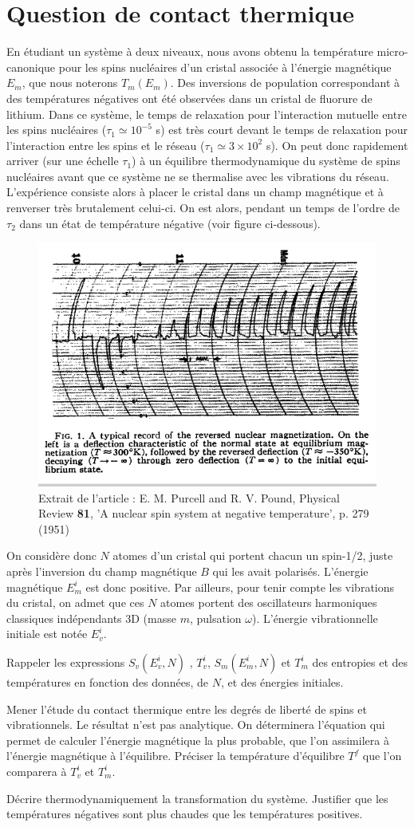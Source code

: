 \documentclass[utf8, 11pt]{feuille}
\begin{document}
\section{Question de contact thermique}
En étudiant un système à deux niveaux, nous avons obtenu la température micro-canonique pour les spins nucléaires d'un cristal associée à l'énergie magnétique $E_m$, que nous noterons $T_m(E_m)$. Des inversions de population correspondant à des températures négatives ont été observées dans un cristal de fluorure de lithium. Dans ce système, le temps de relaxation pour l'interaction mutuelle entre les spins nucléaires ($\tau_1 \simeq 10^{-5}$ s) est très court devant le temps de relaxation pour l'interaction entre les spins et le réseau ($\tau_1 \simeq 3 \times 10^{2}$ s). On peut donc rapidement arriver (sur une échelle $\tau_1$) \`a un équilibre thermodynamique du système de spins nucléaires avant que ce système ne se thermalise avec les vibrations du réseau. L'expérience consiste alors à placer le cristal dans un champ magnétique et à renverser très brutalement celui-ci. On est alors, pendant un temps de l'ordre de $\tau_2$ dans un état de température négative (voir figure ci-dessous).

\begin{figure}[!t]
\centering
\includegraphics[height=.38 \textwidth]{negative}
\caption{Extrait de l'article : E. M. Purcell and R. V. Pound, Physical Review \textbf{81}, 'A nuclear spin system at negative temperature', p. 279 (1951)}
\label{FTN}
\end{figure}

On considère donc $N$ atomes d'un cristal qui portent chacun un spin-1/2, juste après l'inversion du champ magnétique $B$ qui les avait polarisés. L'énergie magnétique $E_m^i$ est donc positive. Par ailleurs, pour tenir compte les vibrations du cristal, on admet que ces $N$ atomes  portent des oscillateurs harmoniques classiques indépendants 3D (masse $m$, pulsation $\omega$). L'énergie vibrationnelle initiale est notée $E_v^i$.


\question
Rappeler les expressions $S_v(E_v^i,N)$ , $T_v^i$, $S_m(E_m^i,N)$ et $T_m^i$ des entropies et des températures en fonction des données, de $N$, et des énergies initiales.


\question
Mener l'étude du contact thermique entre les degrés de liberté de spins et vibrationnels. Le résultat n'est pas analytique. On déterminera l'équation qui permet de calculer l'énergie magnétique la plus probable, que l'on assimilera à l'énergie magnétique à l'équilibre. Préciser la température d'équilibre $T^f$ que l'on comparera à $T^i_v$ et $T_m^i$.


\question
Décrire thermodynamiquement la transformation du système. Justifier que les températures négatives sont plus chaudes que les températures positives.
\end{document}
